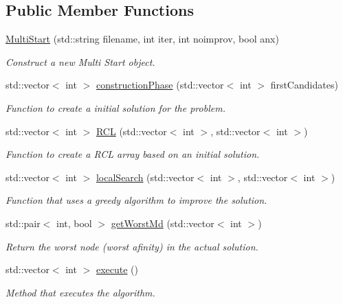 \subsection*{Public Member Functions}
\begin{DoxyCompactItemize}
\item 
\hyperlink{classMultiStart_ae16c330042c4b1dfb87dae8312d07a65}{Multi\+Start} (std\+::string filename, int iter, int noimprov, bool anx)
\begin{DoxyCompactList}\small\item\em Construct a new Multi Start object. \end{DoxyCompactList}\item 
std\+::vector$<$ int $>$ \hyperlink{classMultiStart_a29c5796648ede3e6c7fe8ca8043f8187}{construction\+Phase} (std\+::vector$<$ int $>$ first\+Candidates)
\begin{DoxyCompactList}\small\item\em Function to create a initial solution for the problem. \end{DoxyCompactList}\item 
std\+::vector$<$ int $>$ \hyperlink{classMultiStart_a456dc441b6e7028aa86a0488830f9bc1}{R\+CL} (std\+::vector$<$ int $>$, std\+::vector$<$ int $>$)
\begin{DoxyCompactList}\small\item\em Function to create a R\+CL array based on an initial solution. \end{DoxyCompactList}\item 
std\+::vector$<$ int $>$ \hyperlink{classMultiStart_af27ae5dbba5f924070f103b7bf5987a3}{local\+Search} (std\+::vector$<$ int $>$, std\+::vector$<$ int $>$)
\begin{DoxyCompactList}\small\item\em Function that uses a greedy algorithm to improve the solution. \end{DoxyCompactList}\item 
std\+::pair$<$ int, bool $>$ \hyperlink{classMultiStart_a0ad5ed40a5c4ab964cb27f79343eed98}{get\+Worst\+Md} (std\+::vector$<$ int $>$)
\begin{DoxyCompactList}\small\item\em Return the worst node (worst afinity) in the actual solution. \end{DoxyCompactList}\item 
std\+::vector$<$ int $>$ \hyperlink{classMultiStart_a9d842b1f602c4b8a47bf6d88d483ccae}{execute} ()
\begin{DoxyCompactList}\small\item\em Method that executes the algorithm. \end{DoxyCompactList}\end{DoxyCompactItemize}

